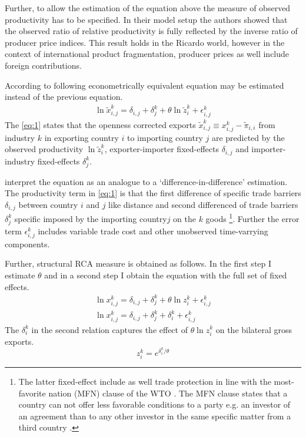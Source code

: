 \par 
Further, to allow the estimation of the equation above the measure of observed productivity has to be specified. In their model setup
the authors showed that the observed ratio of relative productivity is fully reflected  by the inverse ratio of producer price indices.  This result holds in the Ricardo world, however in the context of international product fragmentation, producer prices as well include foreign contributions.
\par
According to \textcite{Costinot} following econometrically equivalent equation may be estimated instead of the previous equation.
  \begin{align} \label{eq:1} \ln \tilde{x}_{i,j}^k=\delta_{i,j}+\delta_j^k + \theta \ln\tilde{z}_i^k+\epsilon^k_{i,j} \end{align}  
The \cref{eq:1} states that the openness corrected exports  $\tilde{x}_{i,j}^k \equiv x_{i,j}^k -  \tilde{\pi}_{i,i} $ from industry $k$ in exporting country $i$ to importing country $j$ are predicted by the observed productivity $\ln\tilde{z}_i^k$,  exporter-importer fixed-effects $\delta_{i,j}$ and importer-industry fixed-effects $\delta_j^k$. \par \textcite{costinot} interpret the equation as an analogue to a `difference-in-difference' estimation. 
The productivity term in \cref{eq:1} is that the first difference of specific trade barriers $\delta_{i,j}$ between country $i$ and $j$ like distance and second differenced of trade barriers $\delta_j^k$ specific imposed by the importing country$j$ on the $k$ goods \footnote{The latter fixed-effect include as well  trade protection in line with the most-favorite nation (MFN) clause of the WTO \parencite{costinot}. The MFN clause states that a country can not offer less favorable conditions to a party e.g. an investor of an agreement than to any other investor in the same specific matter from a third country  \parencite{oecd-mfn}.}. Further the error term $\epsilon^k_{i,j}$ includes variable trade cost and other unobserved time-varrying components. \par
Further, structural RCA measure is obtained as follows. In the first step I estimate $\theta$ and in a second step I obtain the equation with the full set of fixed effects.
   \begin{align} \label{eq:2}\ln {x}_{i,j}^k=\delta_{i,j}+\delta_j^k + \theta \ln{z}_i^k
+\epsilon^k_{i,j} \\
\ln {x}_{i,j}^k=\delta_{i,j}+\delta_j^k + \delta_i^k + \epsilon^k_{i,j} \end{align}
The $\delta_i^k$ in the second relation captures the effect of  $\theta \ln{z}_i^k$ on the bilateral gross exports. 
  \[ z^k_i=e^{{\delta_i^ k}/{\theta}} \] 
